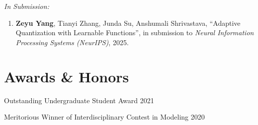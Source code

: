 \documentclass[11pt]{article}
\begin{document}
\vspace{\lineskip}

\textit{In Submission:}

\begin{enumerate}[resume]
    \item \label{anshu-lluf} \textbf{Zeyu Yang}, Tianyi Zhang, Junda Su, Anshumali Shrivastava, ``Adaptive Quantization with Learnable Functions'', in submission to \textit{Neural Information Processing Systems (NeurIPS)}, 2025.
\end{enumerate}

\section*{Awards \& Honors}

Outstanding Undergraduate Student Award \hfill 2021

Meritorious Winner of Interdisciplinary Contest in Modeling \hfill 2020
\end{document}
